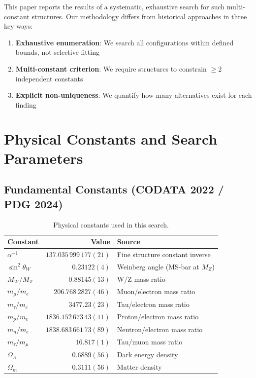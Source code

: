 \documentclass[11pt,a4paper]{article}
\begin{document}
This paper reports the results of a systematic, exhaustive search for such multi-constant structures. Our methodology differs from historical approaches in three key ways:
\begin{enumerate}
    \item \textbf{Exhaustive enumeration}: We search all configurations within defined bounds, not selective fitting
    \item \textbf{Multi-constant criterion}: We require structures to constrain $\geq 2$ independent constants
    \item \textbf{Explicit non-uniqueness}: We quantify how many alternatives exist for each finding
\end{enumerate}

\section{Physical Constants and Search Parameters}

\subsection{Fundamental Constants (CODATA 2022 / PDG 2024)}

\begin{table}[h]
\centering
\begin{tabular}{lrl}
\hline
Constant & Value & Source \\
\hline
$\alpha^{-1}$ & $137.035\,999\,177(21)$ & Fine structure constant inverse \\
$\sin^2\theta_W$ & $0.23122(4)$ & Weinberg angle (MS-bar at $M_Z$) \\
$M_W/M_Z$ & $0.88145(13)$ & W/Z mass ratio \\
$m_\mu/m_e$ & $206.768\,2827(46)$ & Muon/electron mass ratio \\
$m_\tau/m_e$ & $3477.23(23)$ & Tau/electron mass ratio \\
$m_p/m_e$ & $1836.152\,673\,43(11)$ & Proton/electron mass ratio \\
$m_n/m_e$ & $1838.683\,661\,73(89)$ & Neutron/electron mass ratio \\
$m_\tau/m_\mu$ & $16.817(1)$ & Tau/muon mass ratio \\
$\Omega_\Lambda$ & $0.6889(56)$ & Dark energy density \\
$\Omega_m$ & $0.3111(56)$ & Matter density \\
\hline
\end{tabular}
\caption{Physical constants used in this search.}
\end{table}
\end{document}
